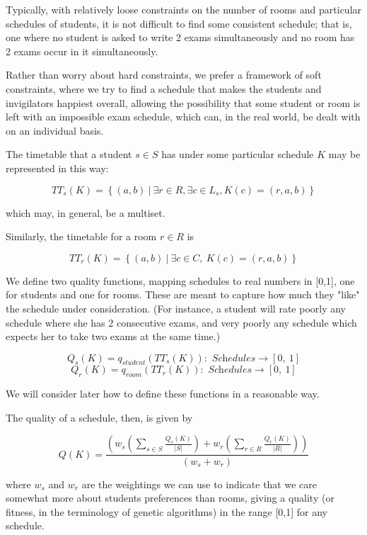 \documentclass[letterpaper]{article}
\begin{document}
  Typically, with relatively loose constraints on the number of rooms and 
  particular schedules of students, it is not difficult to find some consistent
  schedule; that is, one where no student is asked to write 2 exams
  simultaneously and no room has 2 exams occur in it simultaneously.

  Rather than worry about hard constraints, we prefer a framework of soft 
  constraints, where we try to find a schedule that makes the students and 
  invigilators happiest overall, allowing the possibility that some student 
  or room is left with an impossible exam schedule, which can, in the real 
  world, be dealt with on an individual basis.
  
  The timetable that a student $s \in S$ has under some particular schedule 
  $K$ may be represented in this way:
  
  \[ TT_s(K) = \left\{(a, b)\ |\ \exists r \in R, \exists c \in L_s, K(c)=(r, a, b) \right\} \]
  
  which may, in general, be a multiset.
  
  Similarly, the timetable for a room $r \in R$ is
  
  \[ TT_r(K)=\left\{(a, b)\ |\ \exists c\in C,\ K(c)=(r, a, b)\right\} \]
  
  We define two quality functions, mapping schedules to real numbers in [0,1],
  one for students and one for rooms. These are meant to capture how much they
  "like" the schedule under consideration. (For instance, a student will rate
  poorly any schedule where she has 2 consecutive exams, and very poorly any 
  schedule which expects her to take two exams at the same time.)
  
  \[ Q_s(K)=q_{student}\left(TT_s(K)\right):\textit{ Schedules}\rightarrow [0,\ 1] \]
  \[ Q_r(K)=q_{room}\left(TT_r(K)\right):\textit{ Schedules}\rightarrow [0,\ 1] \]
  
  We will consider later how to define these functions in a reasonable way.

  The quality of a schedule, then, is given by
  
  \[ Q(K)= \frac{\left(w_s\left(\sum_{s \in S}{\frac{Q_s(K)}{|S|}}\right) +
     w_r\left(\sum_{r\in R}{\frac{Q_r(K)}{|R|}} \right)\right)}{(w_s+w_r)} \]
  
  where $w_s$ and $w_r$ are the weightings we can use to indicate that we 
  care somewhat more about students preferences than rooms, giving a quality
  (or fitness, in the terminology of genetic algorithms) in the range [0,1] for
  any schedule.
  
\end{document}
